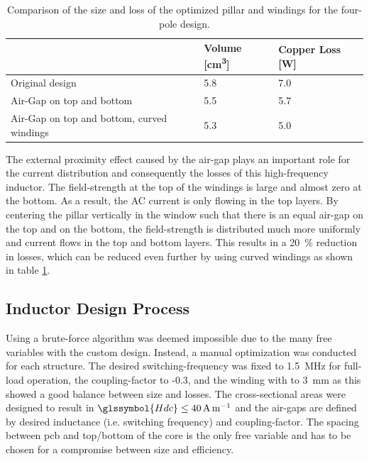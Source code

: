 \documentclass{IPEC2026}
\newcommand{\sbl}[1]{\glssymbol{#1}}
\newcommand{\ac}{\gls}
\begin{document}
\begin{table}
  \centering
  \caption{Comparison of the size and loss of the optimized pillar and windings for the four-pole design.}
    \begin{tabular}{|p{}|p{}|p{}|}
    \hline  
      & {Volume [\unit{\cubic\cm}]} & {Copper Loss [\unit{\W}]} \\
    \hline
    \hline
    Original design & 5.8 & 7.0 \\
    \hline
    Air-Gap on top and bottom & 5.5 & 5.7 \\
    \hline
    Air-Gap on top and bottom, curved windings & 5.3 & 5.0 \\
    \hline
    \end{tabular}%
  \label{tab:OptimizationPQ}%
\end{table}%

The external proximity effect caused by the air-gap plays an important role for the current distribution and consequently the losses of this high-frequency inductor. The field-strength at the top of the windings is large and almost zero at the bottom. As a result, the AC current is only flowing in the top layers. By centering the pillar vertically in the window such that there is an equal air-gap on the top and on the bottom, the field-strength is distributed much more uniformly and current flows in the top and bottom layers. This results in a \qty{20}{\percent} reduction in losses, which can be reduced even further by using curved windings as shown in table \ref{tab:OptimizationPQ}.

\subsection{Inductor Design Process}
Using a brute-force algorithm was deemed impossible due to the many free variables with the custom design. Instead, a manual optimization was conducted for each structure. The desired switching-frequency was fixed to \qty{1.5}{\MHz} for full-load operation, the coupling-factor to -0.3, and the winding with to \qty{3}{\mm} as this showed a good balance between size and losses. The cross-sectional areas were designed to result in $\sbl{Hdc} \leq \qty{40}{\A\per\m}$ and the air-gaps are defined by desired inductance (i.e. switching frequency) and coupling-factor. The spacing between \ac{pcb} and top/bottom of the core is the only free variable and has to be chosen for a compromise between size and efficiency.
\end{document}
